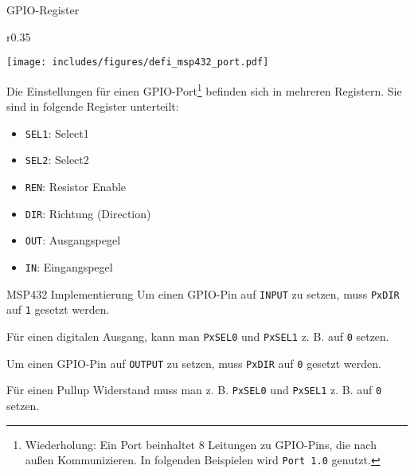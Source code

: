 \begin{defi}{GPIO-Register}
    \begin{wrapfigure}{r}{0.35\textwidth}
        \begin{center}
            \texttt{[image: includes/figures/defi\_msp432\_port.pdf]}
        \end{center}
    \end{wrapfigure}
    Die Einstellungen für einen GPIO-Port\footnote{
        Wiederholung: Ein Port beinhaltet 8 Leitungen zu GPIO-Pins, die nach außen Kommunizieren.
        In folgenden Beispielen wird \texttt{Port 1.0} genutzt.
    } befinden sich in mehreren Registern.
    Sie sind in folgende Register unterteilt:
    \begin{itemize}
        \item \texttt{SEL1}: Select1
        \item \texttt{SEL2}: Select2
        \item \texttt{REN}: Resistor Enable
        \item \texttt{DIR}: Richtung (Direction)
        \item \texttt{OUT}: Ausgangspegel
        \item \texttt{IN}: Eingangspegel
    \end{itemize}
\end{defi}

\begin{bonus}{MSP432 Implementierung}
    Um einen GPIO-Pin auf \texttt{INPUT} zu setzen, muss \texttt{PxDIR} auf \texttt{1} gesetzt werden.

    Für einen digitalen Ausgang, kann man \texttt{PxSEL0} und \texttt{PxSEL1} z. B. auf \texttt{0} setzen.

    Um einen GPIO-Pin auf \texttt{OUTPUT} zu setzen, muss \texttt{PxDIR} auf \texttt{0} gesetzt werden.

    Für einen Pullup Widerstand muss man z. B. \texttt{PxSEL0} und \texttt{PxSEL1} z. B. auf \texttt{0} setzen.
\end{bonus}

